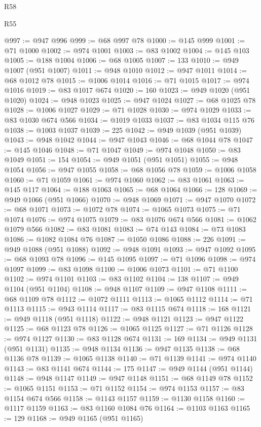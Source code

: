 \begin{lexlean}{R58}
\begin{lexlean}{R55}
\begin{coremodule}
{{{{{{{{{{{{{{{{{{{{{{{{{{{{{{{{{{{{{{{{{{{{{{{{{{{{{{{{{{{{{{@997 := @947 @996
@999 := @68 @997 @78
@1000 := @145 @999
@1001 := @71 @1000
@1002 := @974 @1001
@1003 := @83 @1002
@1004 := @145 @103
@1005 := @188 @1004
@1006 := @68 @1005
@1007 := 133
@1010 := @949 @1007 (@951 @1007)
@1011 := @948 @1010
@1012 := @947 @1011
@1014 := @68 @1012 @78
@1015 := @1006 @1014
@1016 := @71 @1015
@1017 := @974 @1016
@1019 := @83 @1017 @674
@1020 := 160
@1023 := @949 @1020 (@951 @1020)
@1024 := @948 @1023
@1025 := @947 @1024
@1027 := @68 @1025 @78
@1028 := @1006 @1027
@1029 := @71 @1028
@1030 := @974 @1029
@1033 := @83 @1030 @674 @566
@1034 := @1019 @1033
@1037 := @83 @1034 @115 @76
@1038 := @1003 @1037
@1039 := 225
@1042 := @949 @1039 (@951 @1039)
@1043 := @948 @1042
@1044 := @947 @1043
@1046 := @68 @1044 @78
@1047 := @145 @1046
@1048 := @71 @1047
@1049 := @974 @1048
@1050 := @83 @1049
@1051 := 154
@1054 := @949 @1051 (@951 @1051)
@1055 := @948 @1054
@1056 := @947 @1055
@1058 := @68 @1056 @78
@1059 := @1006 @1058
@1060 := @71 @1059
@1061 := @974 @1060
@1062 := @83 @1061
@1063 := @145 @117
@1064 := @188 @1063
@1065 := @68 @1064
@1066 := 128
@1069 := @949 @1066 (@951 @1066)
@1070 := @948 @1069
@1071 := @947 @1070
@1072 := @68 @1071
@1073 := @1072 @78
@1074 := @1065 @1073
@1075 := @71 @1074
@1076 := @974 @1075
@1079 := @83 @1076 @674 @566
@1081 := @1062 @1079 @566
@1082 := @83 @1081
@1083 := @74 @143
@1084 := @73 @1083
@1086 := @1082 @1084 @76
@1087 := @1050 @1086
@1088 := 226
@1091 := @949 @1088 (@951 @1088)
@1092 := @948 @1091
@1093 := @947 @1092
@1095 := @68 @1093 @78
@1096 := @145 @1095
@1097 := @71 @1096
@1098 := @974 @1097
@1099 := @83 @1098
@1100 := @1006 @1073
@1101 := @71 @1100
@1102 := @974 @1101
@1103 := @83 @1102
@1104 := 138
@1107 := @949 @1104 (@951 @1104)
@1108 := @948 @1107
@1109 := @947 @1108
@1111 := @68 @1109 @78
@1112 := @1072 @1111
@1113 := @1065 @1112
@1114 := @71 @1113
@1115 := @943 @1114
@1117 := @83 @1115 @674
@1118 := 168
@1121 := @949 @1118 (@951 @1118)
@1122 := @948 @1121
@1123 := @947 @1122
@1125 := @68 @1123 @78
@1126 := @1065 @1125
@1127 := @71 @1126
@1128 := @974 @1127
@1130 := @83 @1128 @674
@1131 := 169
@1134 := @949 @1131 (@951 @1131)
@1135 := @948 @1134
@1136 := @947 @1135
@1138 := @68 @1136 @78
@1139 := @1065 @1138
@1140 := @71 @1139
@1141 := @974 @1140
@1143 := @83 @1141 @674
@1144 := 175
@1147 := @949 @1144 (@951 @1144)
@1148 := @948 @1147
@1149 := @947 @1148
@1151 := @68 @1149 @78
@1152 := @1065 @1151
@1153 := @71 @1152
@1154 := @974 @1153
@1157 := @83 @1154 @674 @566
@1158 := @1143 @1157
@1159 := @1130 @1158
@1160 := @1117 @1159
@1163 := @83 @1160 @1084 @76
@1164 := @1103 @1163
@1165 := 129
@1168 := @949 @1165 (@951 @1165)
}}}}}}}}}}}}}}}}}}}}}}}}}}}}}}}}}}}}}}}}}}}}}}}}}}}}}}}}}}}}}}
\end{coremodule}
\end{lexlean}
\end{lexlean}
